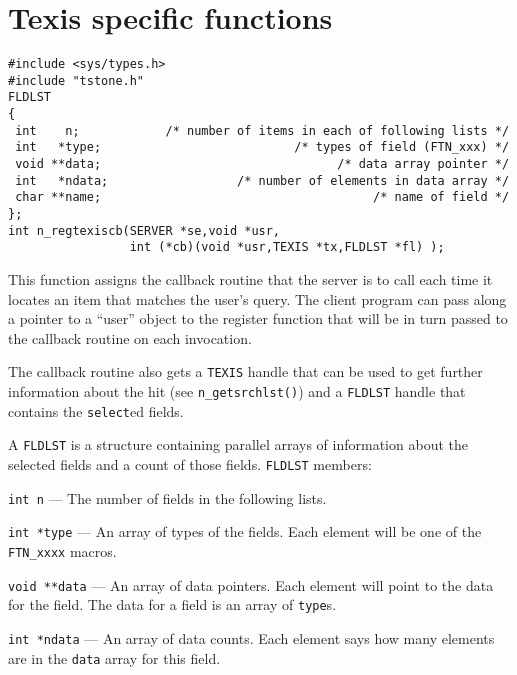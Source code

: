 \newpage\section{Texis specific functions}



\SYNOPSIS
\begin{verbatim}
#include <sys/types.h>
#include "tstone.h"
FLDLST
{
 int    n;            /* number of items in each of following lists */
 int   *type;                           /* types of field (FTN_xxx) */
 void **data;                                 /* data array pointer */
 int   *ndata;                  /* number of elements in data array */
 char **name;                                      /* name of field */
};
int n_regtexiscb(SERVER *se,void *usr,
                 int (*cb)(void *usr,TEXIS *tx,FLDLST *fl) );
\end{verbatim}

\DESCRIPTION

This function assigns the callback routine that the server is to call each
time it locates an item that matches the user's query.  The client program
can pass along a pointer to a ``user'' object to the register function
that will be in turn passed to the callback routine on each invocation.

The callback routine also gets a \verb`TEXIS` handle that can be used to
get further information about the hit (see \verb`n_getsrchlst()`) and a
\verb`FLDLST` handle that contains the \verb`select`ed fields.

A \verb`FLDLST` is a structure containing parallel arrays of information
about the selected fields and a count of those fields. \verb`FLDLST` members:

\verb`int n` --- The number of fields in the following lists.

\verb`int *type` --- An array of types of the fields.  Each element will
be one of the \verb`FTN_xxxx` macros.

\verb`void **data` --- An array of data pointers.  Each element will
point to the data for the field. The data for a field is an
array of \verb`type`s.

\verb`int *ndata` ---  An array of data counts. Each element says how
many elements are in the \verb`data` array for this field.


